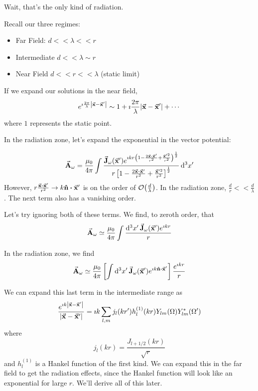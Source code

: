 \documentclass[a4paper,twoside,master.tex]{subfiles}
\begin{document}
Wait, that's the only kind of radiation.

Recall our three regimes:
\begin{itemize}
    \item Far Field: $ d << \lambda << r $
    \item Intermediate $ d << \lambda \sim r $
    \item Near Field $ d << r << \lambda $ (static limit)
\end{itemize}
If we expand our solutions in the near field,
\begin{equation}
    e^{\imath \frac{2 \pi}{\lambda} \abs{ \va{x} - \va{x}'}} \sim 1 + \imath \frac{2 \pi}{\lambda} \abs{ \va{x} - \va{x}'} + \cdots
\end{equation}
where $ 1 $ represents the static point.

In the radiation zone, let's expand the exponential in the vector potential:

\begin{equation}
    \va{A}_{\omega} = \frac{\mu_0}{4 \pi} \int \frac{ \va{J}_{\omega}( \va{x}') e^{\imath k r \left( 1 - \frac{2 \va{x} \vdot \va{x}'}{r^2} + \frac{ \va{x}'^2}{r^2} \right)^{\frac{1}{2}}}}{r \left[ 1 - \frac{2 \va{x} \vdot \va{x}'}{r^2} + \frac{ \va{x}'^2}{r^2} \right]^{\frac{1}{2}}} \dd[3]{x'}
\end{equation}
However, $ r \frac{ \va{x} \vdot \va{x}'}{r^2} \to k \vu{n} \vdot \va{x}' $ is on the order of $ \order{\frac{d}{\lambda}} $. In the radiation zone, $ \frac{d}{r} << \frac{d}{\lambda} $. The next term also has a vanishing order.

Let's try ignoring both of these terms. We find, to zeroth order, that
\begin{equation}
    \va{A}_{\omega} \simeq \frac{\mu_0}{4 \pi} \int \frac{\dd[3]{x'} \va{J}_{\omega}( \va{x}') e^{\imath k r}}{r}
\end{equation}

In the radiation zone, we find
\begin{equation}
    \va{A}_{\omega} \simeq \frac{\mu_0}{4 \pi} \left[ \int \dd[3]{x'} \va{J}_{\omega}( \va{x}') e^{\imath k \vu{n} \vdot \va{x}'} \right] \frac{e^{\imath kr}}{r}
\end{equation}

We can expand this last term in the intermediate range as
\begin{equation}
    \frac{e^{\imath k \abs{ \va{x} - \va{x}'}}}{\abs{ \va{x} - \va{x}'}} = \imath k \sum_{l,m} j_{l} (kr') h_{l}^{(1)} (kr) Y_{lm}(\Omega) Y_{lm}^*(\Omega') 
\end{equation}
where
\begin{equation}
    j_{l}(kr) = \frac{J_{l+ 1/2}(kr)}{\sqrt{r}}
\end{equation}
and $ h_{l}^{(1)} $ is a Hankel function of the first kind. We can expand this in the far field to get the radiation effects, since the Hankel function will look like an exponential for large $ r $. We'll derive all of this later.
\end{document}
